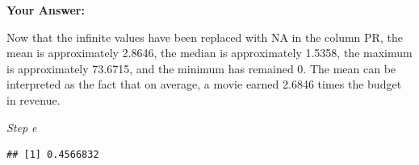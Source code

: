 \documentclass[
]{article}
\newenvironment{Shaded}{\begin{snugshade}}{\end{snugshade}}
\newcommand{\AttributeTok}[1]{\textcolor[rgb]{0.13,0.29,0.53}{#1}}
\newcommand{\CommentTok}[1]{\textcolor[rgb]{0.56,0.35,0.01}{\textit{#1}}}
\newcommand{\ConstantTok}[1]{\textcolor[rgb]{0.56,0.35,0.01}{#1}}
\newcommand{\DecValTok}[1]{\textcolor[rgb]{0.00,0.00,0.81}{#1}}
\newcommand{\FunctionTok}[1]{\textcolor[rgb]{0.13,0.29,0.53}{\textbf{#1}}}
\newcommand{\NormalTok}[1]{#1}
\newcommand{\OtherTok}[1]{\textcolor[rgb]{0.56,0.35,0.01}{#1}}
\newcommand{\SpecialCharTok}[1]{\textcolor[rgb]{0.81,0.36,0.00}{\textbf{#1}}}
\begin{document}
\begin{Shaded}
\end{Shaded}

\textbf{Your Answer:}

Now that the infinite values have been replaced with NA in the column
PR, the mean is approximately 2.8646, the median is approximately
1.5358, the maximum is approximately 73.6715, and the minimum has
remained 0. The mean can be interpreted as the fact that on average, a
movie earned 2.6846 times the budget in revenue.

\emph{Step e}

\begin{Shaded}
\end{Shaded}

\begin{verbatim}
## [1] 0.4566832
\end{verbatim}

\begin{Shaded}
\end{Shaded}
\end{document}
